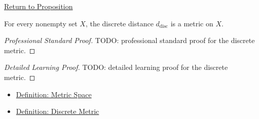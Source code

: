 \newpage
{}
\label{prf:discrete-metric-space}

\begin{remark*}[Return]
\hyperref[prop:discrete-metric-space]{Return to Proposition}
\end{remark*}

\begin{proposition*}
For every nonempty set \(X\), the discrete distance
\(d_{\mathrm{disc}}\) is a metric on \(X\).
\end{proposition*}

\begin{proof}[Professional Standard Proof]
\LRAProofBodyStart
TODO: professional standard proof for the discrete metric.
\end{proof}

\begin{proof}[Detailed Learning Proof]
\LRAProofBodyStart
TODO: detailed learning proof for the discrete metric.
\end{proof}

\begin{remark*}
\end{remark*}

\begin{dependencies}
\begin{itemize}
  \item \hyperref[def:metric-space]{Definition: Metric Space}
  \item \hyperref[def:discrete-metric]{Definition: Discrete Metric}
\end{itemize}
\end{dependencies}

\clearpage

